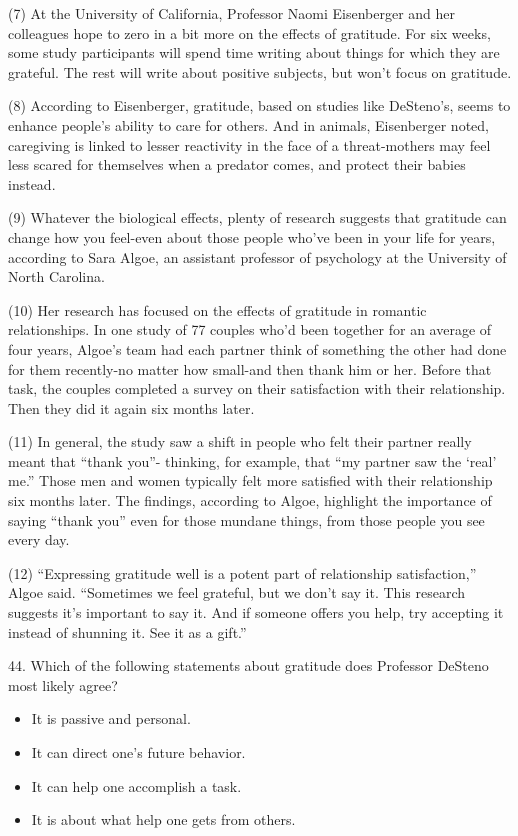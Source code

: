 \documentclass[UTF8,11pt]{ctexart}
\begin{document}
(7) At the University of California, Professor Naomi Eisenberger and her colleagues hope to zero in a bit more on the effects of gratitude. For six weeks, some study participants will spend time writing about things for which they are grateful. The rest will write about positive subjects, but won’t focus on gratitude.


(8) According to Eisenberger, gratitude, based on studies like DeSteno’s, seems to enhance people’s ability to care for others. And in animals, Eisenberger noted, caregiving is linked to lesser reactivity in the face of a threat-mothers may feel less scared for themselves when a predator comes, and protect their babies instead.


(9) Whatever the biological effects, plenty of research suggests that gratitude can change how you feel-even about those people who’ve been in your life for years, according to Sara Algoe, an assistant professor of psychology at the University of North Carolina.


(10) Her research has focused on the effects of gratitude in romantic relationships. In one study of 77 couples who’d been together for an average of four years, Algoe’s team had each partner think of something the other had done for them recently-no matter how small-and then thank him or her. Before that task, the couples completed a survey on their satisfaction with their relationship. Then they did it again six months later.


(11) In general, the study saw a shift in people who felt their partner really meant that “thank you”- thinking, for example, that “my partner saw the ‘real’ me.” Those men and women typically felt more satisfied with their relationship six months later. The findings, according to Algoe, highlight the importance of saying “thank you” even for those mundane things, from those people you see every day.


(12) “Expressing gratitude well is a potent part of relationship satisfaction,” Algoe said. “Sometimes we feel grateful, but we don’t say it. This research suggests it’s important to say it. And if someone offers you help, try accepting it instead of shunning it. See it as a gift.”


44. Which of the following statements about gratitude does Professor DeSteno most likely agree?


\begin{itemize}[leftmargin=2em,itemsep=.2em,topsep=.4em]\item[A.] It is passive and personal.
\item[B.] It can direct one’s future behavior.
\item[C.] It can help one accomplish a task.
\item[D.] It is about what help one gets from others.
\end{itemize}
\end{document}
